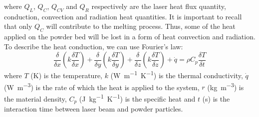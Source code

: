 where $Q_L$, $Q_C$, $Q_{CV}$ and $Q_R$ respectively are the laser heat flux quantity, conduction, convection and radiation heat quantities. It is important to recall that only $Q_C$ will contribute to the melting process. Thus, some of the heat applied on the powder bed will be lost in a form of heat convection and radiation. To describe the heat conduction, we can use Fourier's law:
\begin{equation}
    \label{eq:nonsiecapitouncazzo}
    \frac{\delta}{\delta x}\left(k \frac{\delta T}{\delta x}\right)+\frac{\delta}{\delta y}\left(k \frac{\delta T}{\delta y}\right)+\frac{\delta}{\delta z}\left(k \frac{\delta T}{\delta z}\right)+\dot{q} =\rho C_p \frac{\delta T}{\delta t}
\end{equation}
where $T$ (\unit{\kelvin}) is the temperature, $k$ (\unit{\watt.\metre^{-1}.\kelvin^{-1}}) is the thermal conductivity, $\dot{q}$ (\unit{\watt.\metre^{-3}}) is the rate of which the heat is applied to the system, $r$ (\unit{\kilo\gram.\metre^{-3}}) is the material density, $C_p$ (\unit{\joule. \kilo\gram^{-1}.\kelvin^{-1}}) is the specific heat and $t$ (\unit{\second}) is the interaction time between laser beam and powder particles.



